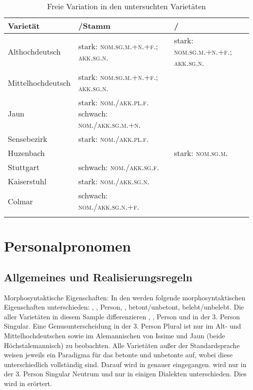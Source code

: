 \begin{table}
\caption{ Freie Variation in den untersuchten Varietäten}\label{table5.18}
\begin{tabularx}{\textwidth}{lQX}
\lsptoprule
Varietät & \slash Stamm & \slash {}\\\midrule
Althochdeutsch & stark: \textsc{nom.sg.m.+n.+f.}; \textsc{akk.sg.n.} & stark: \textsc{nom.sg.m.+n.+f.}; \textsc{akk.sg.n.}\\
Mittelhochdeutsch & stark: \textsc{nom.sg.m.+n.+f.}; \textsc{akk.sg.n.} & \\
Jaun & stark: \textsc{nom./akk.pl.f.} schwach: \textsc{nom./akk.sg.m.+n.} &  \\
Sensebezirk & stark: \textsc{nom./akk.pl.f.} & \\
Huzenbach & & stark: \textsc{nom.sg.m.} \\
Stuttgart & schwach: \textsc{nom./akk.sg.f.}  & \\
Kaiserstuhl & stark: \textsc{nom./akk.sg.n.} & \\
Colmar & schwach:    \textsc{nom./akk.sg.n.+f.} & \\
\lspbottomrule
\end{tabularx}
\end{table}



\section{Personalpronomen}\label{5.3}

\subsection{Allgemeines und Realisierungsregeln}\label{5.3.1}

{Morphosyntaktische Eigenschaften}: In den  werden folgende morphosyntaktischen Eigenschaften unterschieden: , , Person, , be\-tont/un\-be\-tont, be\-lebt/un\-be\-lebt. Die  aller Varietäten in diesem Sample differenzieren , , Person und  in der 3. Person Singular. Eine Genusunterscheidung in der 3. Person Plural ist nur im Alt- und Mittelhochdeutschen sowie im Alemannischen von Issime und Jaun (beide Höchstalemannisch) zu beobachten. Alle Varietäten außer der Standardsprache weisen jeweils ein Paradigma für das betonte und unbetonte  auf, wobei diese unterschiedlich vollständig sind. Darauf wird in  genauer eingegangen.  wird nur in der 3. Person Singular Neutrum und nur in einigen Dialekten unterschieden. Dies wird in  erörtert.

